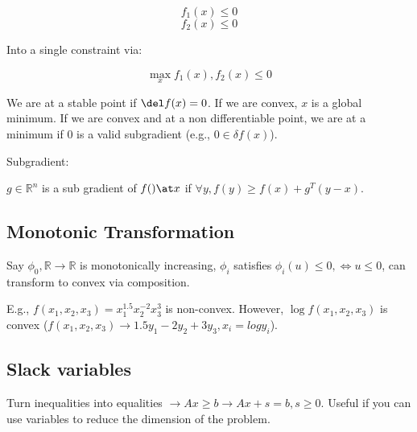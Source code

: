 \documentclass[10pt]{article}
\begin{document}
$$
f_1(x) \le 0
$$
$$
f_2(x) \le 0
$$

Into a single constraint via:

$$
\max_x f_1(x), f_2(x) \le 0
$$

We are at a stable point if $\del f(x) = 0$. If we are convex, $x$ is a global minimum. If we are convex
and at a non differentiable point, we are at a minimum if 0 is a valid subgradient (e.g., $0 \in \delta
f(x)$).

Subgradient:

$g \in \mathbb{R}^n$ is a sub gradient of $f() \at x$ if $\forall y, f(y) \ge f(x) + g^T(y - x)$.

\subsection{Monotonic Transformation}

Say $\phi_0, \mathbb{R} \rightarrow \mathbb{R}$ is monotonically increasing, $\phi_i$ satisfies
$\phi_i(u) \le 0, \iff u \le 0$, can transform to convex via composition.

E.g., $f(x_1, x_2, x_3) = x^{1.5}_1 x_2^{-2} x_3^{3}$ is non-convex. However, $\log f(x_1, x_2, x_3)$ is
convex ($f(x_1, x_2, x_3) \rightarrow 1.5 y_1 - 2 y_2 + 3 y_3, x_i = log y_i$).

\subsection{Slack variables}

Turn inequalities into equalities $\rightarrow Ax \ge b \rightarrow Ax + s = b, s \ge 0$.
Useful if you can use variables to reduce the dimension of the problem.
\end{document}
